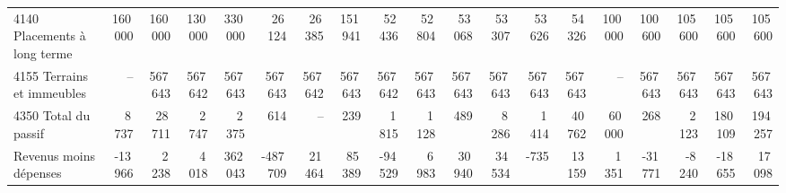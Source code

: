 \begin{tabular}{@{}lrrrrrrrrrrrrrrrrrr@{}}
4140 Placements à long terme & 160\,000 & 160\,000 & 130\,000 & 330\,000 & 26\,124 & 26\,385 & 151\,941 & 52\,436 & 52\,804 & 53\,068 & 53\,307 & 53\,626 & 54\,326 & 100\,000 & 100\,600 & 105\,600 & 105\,600 & 105\,600 \\
4155 Terrains et immeubles & -- & 567\,643 & 567\,642 & 567\,643 & 567\,643 & 567\,642 & 567\,643 & 567\,642 & 567\,643 & 567\,643 & 567\,643 & 567\,643 & 567\,643 & -- & 567\,643 & 567\,643 & 567\,643 & 567\,643 \\
4350 Total du passif & 8\,737 & 28\,711 & 2\,747 & 2\,375 & 614 & -- & 239 & 1\,815 & 1\,128 & 489 & 8\,286 & 1\,414 & 40\,762 & 60\,000 & 268 & 2\,123 & 180\,109 & 194\,257 \\
Revenus moins dépenses & -13\,966 & 2\,238 & 4\,018 & 362\,043 & -487\,709 & 21\,464 & 85\,389 & -94\,529 & 6\,983 & 30\,940 & 34\,534 & -735 & 13\,159 & 1\,351 & -31\,771 & -8\,240 & -18\,655 & 17\,098 \\\bottomrule
\end{tabular}
